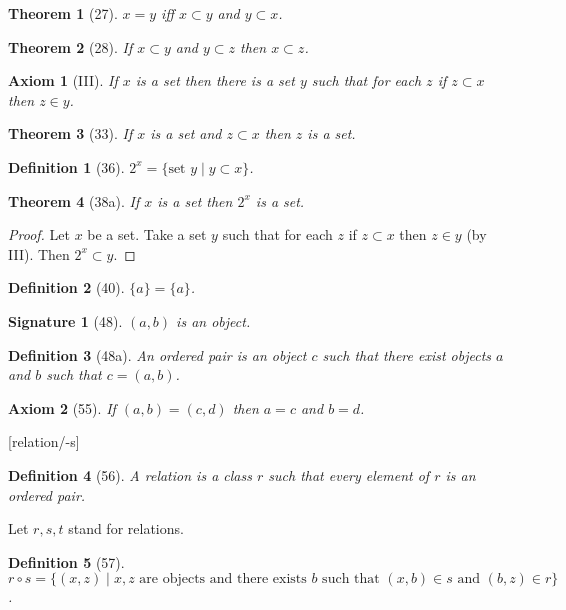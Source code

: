 \documentclass{scrartcl}
\newenvironment{forthel}{\begin{leftbar}}{\end{leftbar}}
\newtheorem*{axiom}{Axiom}
\newtheorem*{theorem}{Theorem}
\newtheorem*{definition}{Definition}
\newtheorem*{signature}{Signature}
\newcommand{\sing}[1]{\{{#1}\}}
\newcommand{\op}[2]{({#1},{#2})}
\begin{document}
\begin{forthel}
\begin{theorem}[27] $x = y$ iff $x \subset y$ and $y \subset x$.
\end{theorem}

\begin{theorem}[28] If $x \subset y$ and $y \subset z$ then $x \subset z$.
\end{theorem}

\begin{axiom}[III] If $x$ is a set then there is a set $y$ such that for each
$z$ if $z \subset x$ then $z \in y$.
\end{axiom}

\begin{theorem}[33] If $x$ is a set and $z \subset x$ then $z$ is a set.
\end{theorem}

\begin{definition}[36] $2^{x} = \{\text{set } y \mid y \subset x\}$.
\end{definition}

\begin{theorem}[38a] If $x$ is a set then $2^{x}$ is a set.
\end{theorem}
\begin{proof} Let $x$ be a set.
Take a set $y$ such that for each $z$ 
if $z \subset x$ then $z \in y$ (by III).
Then $2^{x} \subset y$.
\end{proof}

\begin{definition}[40] $\sing{a} = \{a\}$.
\end{definition}

\begin{signature}[48] $\op{a}{b}$ is an object.
\end{signature}

\begin{definition}[48a]
An \emph{ordered pair} is an object $c$ such that there exist
objects $a$ and $b$ such that $c = \op{a}{b}$.
\end{definition}

\begin{axiom}[55] If $\op{a}{b}=\op{c}{d}$ then
$a = c$ and $b = d$.
\end{axiom}


[relation/-s]
\begin{definition}[56] A \emph{relation} is a class $r$ such that
every element of $r$ is an ordered pair.
\end{definition}

Let $r,s,t$ stand for relations.

\begin{definition}[57] 
$r \circ s =
\{\op{x}{z} \mid x,z \text{ are objects and there exists } b \text{ such that }
\op{x}{b} \in s \text{ and } \op{b}{z} \in r\}$.
\end{definition}


\end{forthel}
\end{document}
